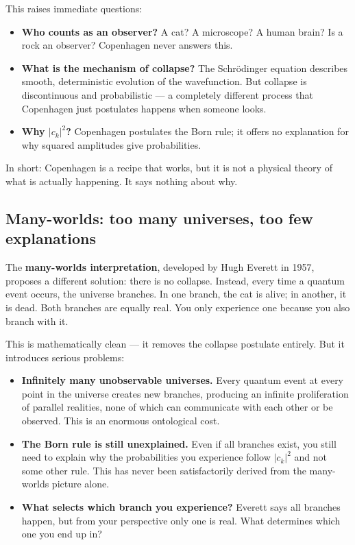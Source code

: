 \documentclass[11pt,a4paper]{article}
\newcommand{\term}[1]{\textbf{#1}}
\begin{document}
This raises immediate questions:
\begin{itemize}
  \item \textbf{Who counts as an observer?}  A cat?  A microscope?  A human brain?
    Is a rock an observer?  Copenhagen never answers this.
  \item \textbf{What is the mechanism of collapse?}  The Schr\"{o}dinger equation
    describes smooth, deterministic evolution of the wavefunction.  But collapse
    is discontinuous and probabilistic --- a completely different process that
    Copenhagen just postulates happens when someone looks.
  \item \textbf{Why $|c_k|^2$?}  Copenhagen postulates the Born rule; it offers
    no explanation for why squared amplitudes give probabilities.
\end{itemize}

\noindent
In short: Copenhagen is a recipe that works, but it is not a physical theory
of what is actually happening.  It says nothing about why.

\subsection{Many-worlds: too many universes, too few explanations}

The \term{many-worlds interpretation}, developed by Hugh Everett in 1957, proposes
a different solution: there is no collapse.  Instead, every time a quantum event
occurs, the universe branches.  In one branch, the cat is alive; in another, it
is dead.  Both branches are equally real.  You only experience one because you also
branch with it.

This is mathematically clean --- it removes the collapse postulate entirely.
But it introduces serious problems:

\begin{itemize}
  \item \textbf{Infinitely many unobservable universes.}  Every quantum event at
    every point in the universe creates new branches, producing an infinite proliferation
    of parallel realities, none of which can communicate with each other or be
    observed.  This is an enormous ontological cost.
  \item \textbf{The Born rule is still unexplained.}  Even if all branches exist, you
    still need to explain why the probabilities you experience follow $|c_k|^2$
    and not some other rule.  This has never been satisfactorily derived from
    the many-worlds picture alone.
  \item \textbf{What selects which branch you experience?}  Everett says all branches
    happen, but from your perspective only one is real.  What determines which one
    you end up in?
\end{itemize}
\end{document}
